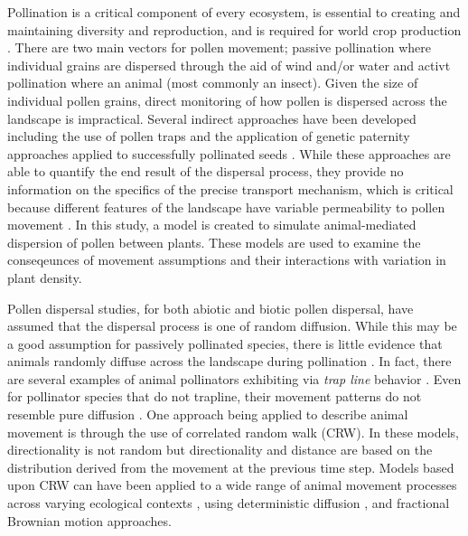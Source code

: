 Pollination is a critical component of every ecosystem, is essential to creating
and maintaining diversity and reproduction, and is required for world crop
production \cite{KleinEtAl2007}.  There are two main vectors for pollen
movement; passive pollination where individual grains are dispersed through the
aid of wind and/or water and activt pollination where an animal (most commonly
an insect).  Given the size of individual pollen grains, direct monitoring of
how pollen is dispersed across the landscape is impractical.  Several indirect
approaches have been developed including the use of pollen traps and the
application of genetic paternity approaches applied to successfully pollinated
seeds \cite{BitzerPatterson1967,StreiffEtAl1999}.  While these approaches are
able to quantify the end result of the dispersal process, they provide no
information on the specifics of the precise transport mechanism, which is
critical because different features of the landscape have variable permeability
to pollen movement \cite{DyerSork2001,DyerEtAl2012}. In this study, a model is
created to simulate animal-mediated dispersion of pollen between plants.  These
models are used to examine the conseqeunces of movement assumptions and their
interactions with variation in plant density.

Pollen dispersal studies, for both abiotic and biotic pollen dispersal, have
assumed that the dispersal process is one of random diffusion.  While this may
be a good assumption for passively pollinated species, there is little evidence
that animals randomly diffuse across the landscape during pollination
\cite{LevinKerster}.  In fact, there are several examples of animal pollinators
exhibiting via \emph{trap line} behavior \cite[e.g., repeated sequential visits
to individual plants]{OhashiThomson}. Even for pollinator species that do not
trapline, their movement patterns do not resemble pure diffusion
\cite{Cresswell03}. One approach being applied to describe animal movement is
through the use of correlated random walk (CRW).  In these models,
directionality is not random but directionality and distance are based on the
distribution derived from the movement at the previous time step.  Models
based upon CRW can have been applied to a wide range of animal movement
processes across varying ecological contexts \cite{Bartumeus07,Byers01}, using
deterministic diffusion \cite{Klages}, and fractional Brownian motion
\cite{Enriquez} approaches.

